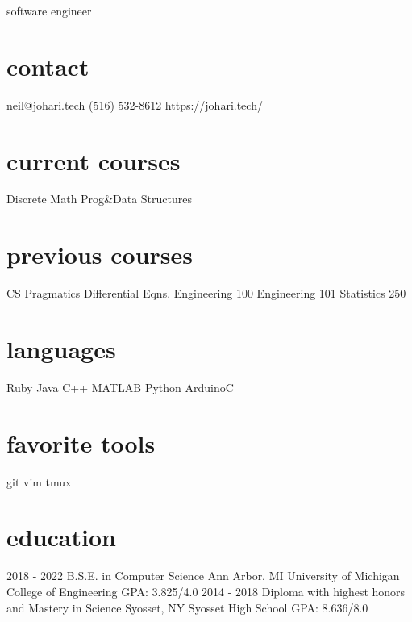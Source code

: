 \documentclass[]{friggeri-cv}
\begin{document}
{\faDesktop\hspace{.2cm} software engineer}


\begin{aside}
    \section{contact}
    \href{mailto:neil@johari.tech}{neil@johari.tech}
    \href{tel:+15165328612}{(516) 532-8612}
    \href{https://johari.tech/}{https://johari.tech/}
    \section{current courses}
    Discrete Math
    Prog\&Data Structures
    \section{previous courses}
    CS Pragmatics
    Differential Eqns.
    Engineering 100
    Engineering 101
    Statistics 250
    \section{languages}
    Ruby
    Java 
    C++
    MATLAB
    Python
    ArduinoC
    \section{favorite tools}
    git
    vim
    tmux
\end{aside}

\section{education}

\begin{entrylist}
    \educationentry
    {2018 - 2022}
    {B.S.E. {\normalfont in Computer Science}}
    {Ann Arbor, MI}
    {University of Michigan College of Engineering}
    {GPA: 3.825/4.0}
    \educationentry
    {2014 - 2018}
    {Diploma {\normalfont with highest honors and Mastery in Science}}
    {Syosset, NY}
    {Syosset High School}
    {GPA: 8.636/8.0}

\end{entrylist}
\end{document}
